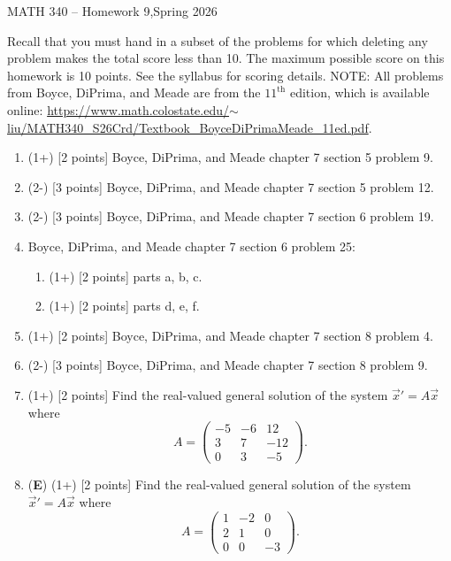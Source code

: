 \documentclass[12pt]{article}
\newcommand{\threebythree}[9]{\begin{pmatrix} %
   #1 & #2 & #3 \\ #4 & #5 & #6 \\ #7 & #8 & #9 \end{pmatrix}}
\begin{document}
\begin{center}
   {\Large MATH 340 -- Homework 9,\quad Spring 2026}
\end{center}

Recall that you must hand in a subset of the problems for which deleting any problem makes the total score less than 10. The maximum possible score on this homework is 10 points. See the syllabus for scoring details. NOTE: All problems from Boyce, DiPrima, and Meade are from the \(11^{\text{th}}\) edition, which is available online: \href{https://www.math.colostate.edu/~liu/MATH340_S26Crd/Textbook_BoyceDiPrimaMeade_11ed.pdf}{https://www.math.colostate.edu/\(\sim\)liu/MATH340\_S26Crd/Textbook\_BoyceDiPrimaMeade\_11ed.pdf}.

\begin{enumerate}

   \item (1+) [2 points] Boyce, DiPrima, and Meade chapter 7 section 5 problem 9.

   \item (2-) [3 points] Boyce, DiPrima, and Meade chapter 7 section 5 problem 12.

   \item (2-) [3 points] Boyce, DiPrima, and Meade chapter 7 section 6 problem 19.
   
   \item Boyce, DiPrima, and Meade chapter 7 section 6 problem 25:
         \begin{enumerate}
            \item (1+) [2 points] parts a, b, c.
            \item (1+) [2 points] parts d, e, f.
         \end{enumerate}

   \item (1+) [2 points] Boyce, DiPrima, and Meade chapter 7 section 8 problem 4.

   \item (2-) [3 points] Boyce, DiPrima, and Meade chapter 7 section 8 problem 9.

   \item (1+) [2 points] Find the real-valued general solution of the system \(\vec{x}'=A\vec{x}\) where
         \[
            A=\threebythree{-5}{-6}{12}{3}{7}{-12}{0}{3}{-5}.
         \]

   \item (\textbf{E}) (1+) [2 points] Find the real-valued general solution of the system \(\vec{x}'=A\vec{x}\) where
         \[
            A=\threebythree{1}{-2}{0}{2}{1}{0}{0}{0}{-3}.
         \]


\end{enumerate}
\end{document}
